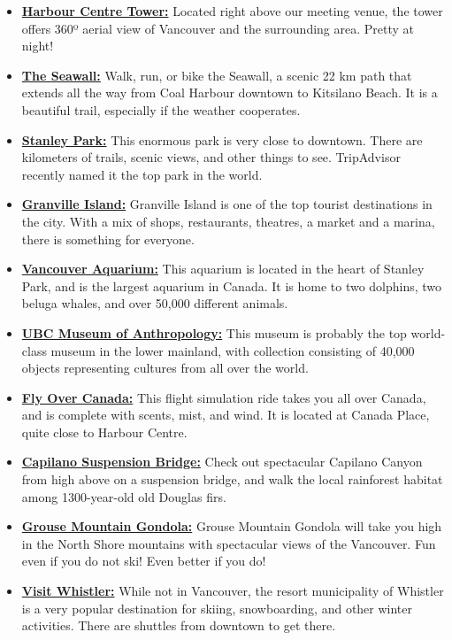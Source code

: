 \documentclass[letterpaper,12pt]{article}
\begin{document}
\begin{itemize}
\setlength{\itemsep}{0pt}
\item \href{http://www.vancouverlookout.com/}{\textbf{Harbour Centre Tower:}} Located right above our meeting venue, the tower offers 360º aerial view of Vancouver and the surrounding area. Pretty at night! 
\item \href{http://vancouver.ca/parks-recreation-culture/seawall.aspx}{\textbf{The Seawall:}} Walk, run, or bike the Seawall, a scenic 22 km path that extends all the way from Coal Harbour downtown to Kitsilano Beach. It is a beautiful trail, especially if the weather cooperates.
\item \href{http://vancouver.ca/parks-recreation-culture/stanley-park.aspx}{\textbf{Stanley Park:}} This enormous park is very close to downtown. There are kilometers of trails, scenic views, and other things to see. TripAdvisor recently named it the top park in the world.
\item \href{http://granvilleisland.com/}{\textbf{Granville Island:}} Granville Island is one of the top tourist destinations in the city. With a mix of shops, restaurants, theatres, a market and a marina, there is something for everyone.
\item \href{http://www.vanaqua.ca}{\textbf{Vancouver Aquarium:}} This aquarium is located in the heart of Stanley Park, and is the largest aquarium in Canada. It is home to two dolphins, two beluga whales, and over 50,000 different animals.
\item \href{http://moa.ubc.ca/}{\textbf{UBC Museum of Anthropology:}} This museum is probably the top world-class museum in the lower mainland, with collection consisting of 40,000 objects representing cultures from all over the world.
\item \href{http://www.flyovercanada.com}{\textbf{Fly Over Canada:}} This flight simulation ride takes you all over Canada, and is complete with scents, mist, and wind. It is located at Canada Place, quite close to Harbour Centre.
\item \href{http://www.capbridge.com/}{\textbf{Capilano Suspension Bridge:}} Check out spectacular Capilano Canyon from high above on a suspension bridge, and walk the local rainforest habitat among 1300-year-old old Douglas firs.
\item \href{http://www.grousemountain.com/}{\textbf{Grouse Mountain Gondola:}} Grouse Mountain Gondola will take you high in the North Shore mountains with spectacular views of the Vancouver. Fun even if you do not ski! Even better if you do!
\item \href{http://www.whistlerblackcomb.com/}{\textbf{Visit Whistler:}} While not in Vancouver, the resort municipality of Whistler is a very popular destination for skiing, snowboarding, and other winter activities. There are shuttles from downtown to get there.
\end{itemize}
\end{document}
